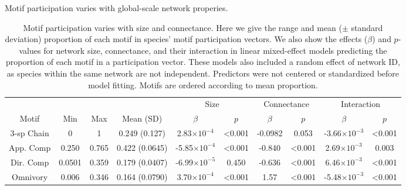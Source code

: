 \documentclass[12pt]{article}
\begin{document}
\begin{spacing}{2.0}
    Motif participation varies with global-scale network properies.
    \begin{table}[hb!]
        \centering
        \caption{Motif participation varies with size and connectance. Here we give the range and mean ($\pm$ standard deviation) proportion of each motif in species' motif participation vectors. 
        We also show the effects ($\beta$) and $p$-values for network size, connectance, and their interaction in linear mixed-effect models predicting the proportion of each motif in a participation vector.
        These models also included a random effect of network ID, as species within the same network are not independent.
        Predictors were not centered or standardized before model fitting. Motifs are ordered according to mean proportion.}
        \label{tab:partic_vs_SC}   
        \footnotesize
        \begin{tabular}{c|c c c | c c | c c | c c}
             &  &  &  & \multicolumn{2}{c|}{Size} & \multicolumn{2}{c|}{Connectance} & \multicolumn{2}{c}{Interaction} \\
            Motif & Min & Max & Mean (SD) & $\beta$ & $p$ & $\beta$ & $p$ & $\beta$ & $p$ \\
            \hline
            3-sp Chain & 0 & 1 & 0.249 (0.127) & 2.83$\times10^{-4}$ & \textless0.001 & -0.0982 & 0.053 & -3.66$\times10^{-3}$ & \textless0.001 \\
            App. Comp & 0.250 & 0.765 & 0.422 (0.0645) & -5.85$\times10^{-4}$ & \textless0.001 & -0.840 & \textless0.001 & 2.69$\times10^{-3}$ & 0.003 \\
            Dir. Comp & 0.0501 & 0.359 & 0.179 (0.0407) & -6.99$\times10^{-5}$ & 0.450 & -0.636 & \textless0.001 & 6.46$\times10^{-3}$ & \textless0.001 \\
            Omnivory & 0.006 & 0.346 & 0.164 (0.0790) & 3.70$\times10^{-4}$ & \textless0.001 & 1.57 & \textless0.001 & -5.48$\times10^{-3}$ & \textless0.001\\   
            \hline
            \end{tabular}
            \end{table}


\end{spacing}
\end{document}
